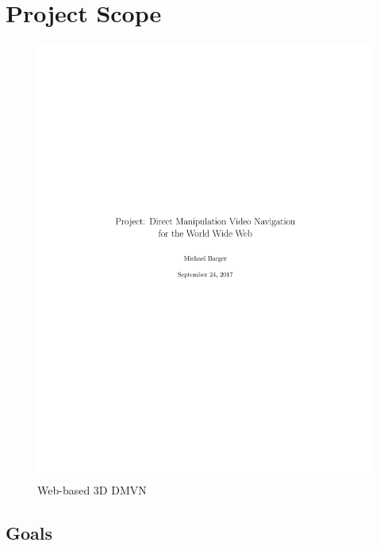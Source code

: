 
\chapter{Project Scope}

\begin{figure}[h]
\centering
\includegraphics[width=\textwidth]{DMVN}
\caption{Web-based 3D DMVN}
\end{figure}

\section{Goals}


